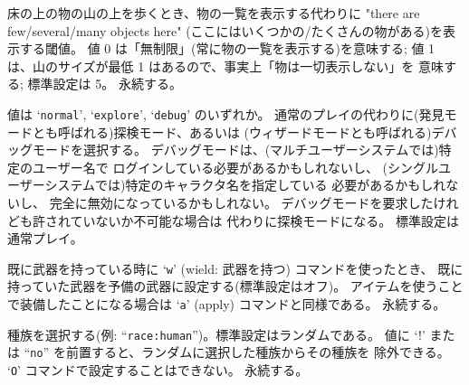 床の上の物の山の上を歩くとき、物の一覧を表示する代わりに
"there are few/several/many objects here"
(ここにはいくつかの/たくさんの物がある)を表示する閾値。
値 0 は「無制限」(常に物の一覧を表示する)を意味する;
値 1 は、山のサイズが最低 1 はあるので、事実上「物は一切表示しない」を
意味する; 標準設定は 5。
永続する。
\item[\ib{playmode}]
値は `{\tt normal}', `{\tt explore}', `{\tt debug}' のいずれか。
通常のプレイの代わりに(発見モードとも呼ばれる)探検モード、あるいは
(ウィザードモードとも呼ばれる)デバッグモードを選択する。
デバッグモードは、(マルチユーザーシステムでは)特定のユーザー名で
ログインしている必要があるかもしれないし、
(シングルユーザーシステムでは)特定のキャラクタ名を指定している
必要があるかもしれないし、
完全に無効になっているかもしれない。
デバッグモードを要求したけれども許されていないか不可能な場合は
代わりに探検モードになる。
標準設定は通常プレイ。
\item[\ib{pushweapon}]
既に武器を持っている時に `{\tt w}' (wield: 武器を持つ) コマンドを使ったとき、
既に持っていた武器を予備の武器に設定する(標準設定はオフ)。
アイテムを使うことで装備したことになる場合は
`{\tt a}' (apply) コマンドと同様である。
永続する。
\item[\ib{race}]
種族を選択する(例: ``{\tt race:human}'')。標準設定はランダムである。
値に `!' または ``{\tt no}'' を前置すると、ランダムに選択した種族からその種族を
除外できる。
`{\tt O}' コマンドで設定することはできない。
永続する。
